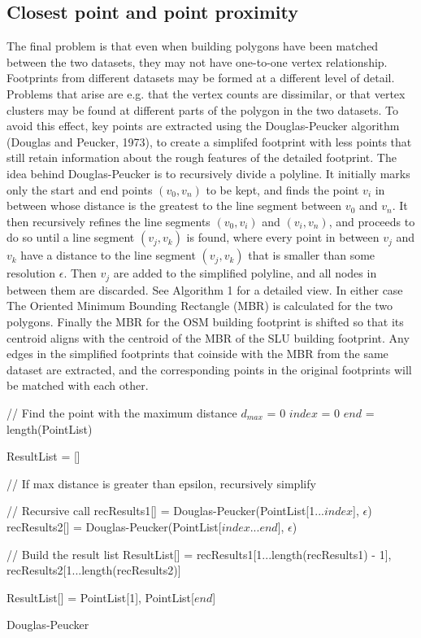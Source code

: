 \documentclass[a4paper]{article}
\begin{document}
\subsection{Closest point and point proximity}

The final problem is that even when building polygons have been matched between the two datasets, they may not have one-to-one vertex relationship. Footprints from different datasets may be formed at a different level of detail. Problems that arise are e.g. that the vertex counts are dissimilar, or that vertex clusters may be found at different parts of the polygon in the two datasets. To avoid this effect, key points are extracted using the Douglas-Peucker algorithm (Douglas and Peucker, 1973), to create a simplifed footprint with less points that still retain information about the rough features of the detailed footprint. The idea behind Douglas-Peucker is to recursively divide a polyline. It initially marks only the start and end points $(v_0, v_n)$ to be kept, and finds the point $v_i$ in between whose distance is the greatest to the line segment between $v_0$ and $v_n$. It then recursively refines the line segments $(v_0, v_i)$ and $(v_i, v_n)$, and proceeds to do so until a line segment $(v_j, v_k)$ is found, where every point in between $v_j$ and $v_k$ have a distance to the line segment $(v_j, v_k)$ that is smaller than some resolution $\epsilon$. Then $v_j$ are added to the simplified polyline, and all nodes in between them are discarded. See Algorithm 1 for a detailed view. In either case The Oriented Minimum Bounding Rectangle (MBR) is calculated for the two polygons. Finally the MBR for the OSM building footprint is shifted so that its centroid aligns with the centroid of the MBR of the SLU building footprint. Any edges in the simplified footprints that coinside with the MBR from the same dataset are extracted, and the corresponding points in the original footprints will be matched with each other.

\begin{algorithm}[H]
\SetAlgoLined
{}
    // Find the point with the maximum distance\;
    $d_{max}$ = 0\;
    $index$ = 0\;
    $end$ = length(PointList)\;
    

    ResultList = []\;
    
    // If max distance is greater than epsilon, recursively simplify\;
     {
        // Recursive call\;
        recResults1[] = Douglas-Peucker(PointList[1...$index$], $\epsilon$)\;
        recResults2[] = Douglas-Peucker(PointList[$index$...$end$], $\epsilon$)\;

        // Build the result list\;
        ResultList[] = {recResults1[1...length(recResults1) - 1], recResults2[1...length(recResults2)]}\;
    }{
        ResultList[] = {PointList[1], PointList[$end$]}\;
    }
    \;

    \caption{Douglas-Peucker}
\end{algorithm}
\end{document}
